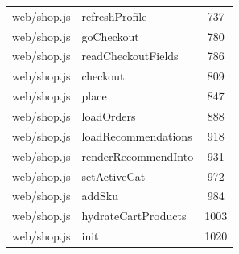 \begin{center}
\begin{longtable}{@{}p{4.6cm}p{5.2cm}c@{}}
web/shop.js & refreshProfile & 737 \\
web/shop.js & goCheckout & 780 \\
web/shop.js & readCheckoutFields & 786 \\
web/shop.js & checkout & 809 \\
web/shop.js & place & 847 \\
web/shop.js & loadOrders & 888 \\
web/shop.js & loadRecommendations & 918 \\
web/shop.js & renderRecommendInto & 931 \\
web/shop.js & setActiveCat & 972 \\
web/shop.js & addSku & 984 \\
web/shop.js & hydrateCartProducts & 1003 \\
web/shop.js & init & 1020 \\
\bottomrule
\end{longtable}
\end{center}